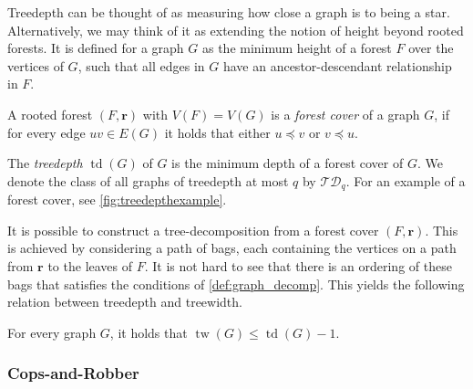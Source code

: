 \documentclass{lmcs}
\theoremstyle{plain}\newtheorem{claim}[thm]{Claim}   %
\DeclareMathOperator{\tw}{tw}
\DeclareMathOperator{\td}{td}
\newcommand{\TD}{\ensuremath{\mathcal{TD}}}
\newcommand{\tup}[1]{\ensuremath{\boldsymbol{#1}}}
\begin{document}
Treedepth can be thought of as measuring how close a graph is to being a star.
Alternatively, we may think of it as extending the notion of height beyond rooted forests.
It is defined for a graph $G$ as the minimum height of a forest $F$ over the vertices of $G$, such that all edges in $G$ have an ancestor-descendant relationship in $F$.

\begin{defi}
	A rooted forest $(F, \tup{r})$ with $V(F) = V(G)$ is a \emph{forest cover} of a graph $G$, if for every edge $uv \in E(G)$ it holds that either $u \preceq v$ or $v \preceq u$.
\end{defi}

The \emph{treedepth} $\td(G)$ of $G$ is the minimum depth of a forest cover of $G$.
We denote the class of all graphs of treedepth at most $q$ by $\TD_q$. 
For an example of a forest cover, see \autoref{fig:treedepthexample}.

It is possible to construct a tree-decomposition from a forest cover $(F, \tup{r})$.
This is achieved by considering a path of bags, each containing the vertices on a path from $\tup{r}$ to the leaves of $F$.
It is not hard to see that there is an ordering of these bags that satisfies the conditions of \autoref{def:graph_decomp}.
This yields the following relation between treedepth and treewidth.

\begin{lem}
	For every graph $G$, it holds that $\tw(G) \leq \td(G) - 1$.
\end{lem}

\subsubsection{Cops-and-Robber}
\end{document}
